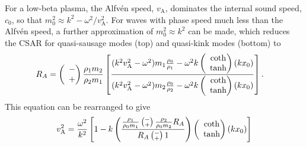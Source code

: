 \documentclass[namedreferences]{solarphysics}
\numberwithin{equation}{section}
\begin{document}
\begin{article}
For a low-beta plasma, the Alfv\'{e}n speed, $v_\textrm{A}$, dominates the internal sound speed, $c_0$, so that $m_0^2 \approx k^2-\omega^2/v_\textrm{A}^2$. For waves with phase speed much less than the Alfv\'{e}n speed, a further approximation of $m_0^2 \approx k^2$ can be made, which reduces the CSAR for quasi-sausage modes (top) and quasi-kink modes (bottom) to
\begin{align}
R_A &= \left(\hspace{-0.07in}\begin{matrix} &- \\ &+ \end{matrix}\right) \frac{\rho_1m_2}{\rho_2m_1} \left[ \frac{(k^2v_\textrm{A}^2-\omega^2)m_1\frac{\rho_0}{\rho_1}-\omega^2k \left(\hspace{-0.07in}\begin{matrix} &\coth \\ &\tanh \end{matrix}\right)(kx_0)}{(k^2v_\textrm{A}^2-\omega^2)m_2\frac{\rho_0}{\rho_2}-\omega^2k \left(\hspace{-0.07in}\begin{matrix} &\coth \\ &\tanh \end{matrix}\right)(kx_0)} \right].
\end{align}
This equation can be rearranged to give
\begin{equation}
v_\textrm{A}^2 = \frac{\omega^2}{k^2} \left[ 1 - k \left( \frac{ \frac{\rho_1}{\rho_0m_1} \left(\substack{- \\ +}\right) \frac{\rho_2}{\rho_0m_2}R_A}{R_A \left(\substack{- \\ +}\right) 1} \right) \left(\hspace{-0.07in}\begin{matrix} &\coth \\ &\tanh \end{matrix}\right) (kx_0)\right]
\end{equation}




\end{article}
\end{document}
